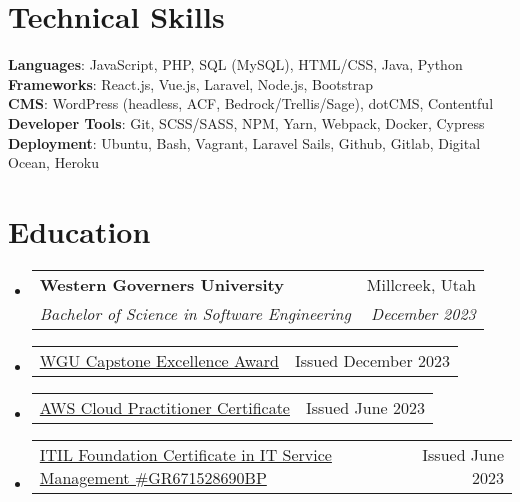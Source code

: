 \documentclass[letterpaper,11pt]{article}
\makeatletter
\newcommand{\resumeSubheading}[4]{
  \vspace{-2pt}\item
    \begin{tabular*}{0.97\textwidth}[t]{l@{\extracolsep{\fill}}r}
      \textbf{#1} & #2 \\
      \textit{\small#3} & \textit{\small #4} \\
    \end{tabular*}\vspace{-7pt}
}
\newcommand{\resumeSubheadingCondensed}[2]{
  \item
    {\small \begin{tabular*}{0.97\textwidth}[t]{l@{\extracolsep{\fill}}r}
      #1 & #2 \\
    \end{tabular*}}\vspace{-7pt}
}
\newcommand{\resumeSubHeadingListStart}{\begin{itemize}[leftmargin=0.15in, label={}]}
\newcommand{\resumeSubHeadingListEnd}{\end{itemize}}
\makeatother
\begin{document}
\section{Technical Skills}
 \begin{itemize}[leftmargin=0.15in, label={}]
    \small{\item{
     \textbf{Languages}{: JavaScript, PHP, SQL (MySQL), HTML/CSS, Java, Python} \\
     \textbf{Frameworks}{: React.js, Vue.js, Laravel, Node.js, Bootstrap} \\
     \textbf{CMS}{: WordPress (headless, ACF, Bedrock/Trellis/Sage), dotCMS, Contentful} \\
     \textbf{Developer Tools}{: Git, SCSS/SASS, NPM, Yarn, Webpack, Docker, Cypress} \\
     \textbf{Deployment}{: Ubuntu, Bash, Vagrant, Laravel Sails, Github, Gitlab, Digital Ocean, Heroku } \\
    }}
 \end{itemize}

\section{Education}
\resumeSubHeadingListStart
  \resumeSubheading
    {Western Governers University}{Millcreek, Utah}
    {Bachelor of Science in  Software Engineering}{December 2023}\vspace{5pt}
  \resumeSubheadingCondensed
    {\href{https://api.badgr.io/public/assertions/vaoUfjA0RT6cZ6-0HZxO3w}{\textcolor{primary}{WGU Capstone Excellence Award}}}{Issued December 2023}
  \resumeSubheadingCondensed
    {\href{https://www.credly.com/badges/a5febee5-016a-4ce3-a014-b824422519a3/public_url}{\textcolor{primary}{AWS Cloud Practitioner Certificate}}}{Issued June 2023}
  \resumeSubheadingCondensed
    {\href{https://www.peoplecert.org/for-corporations/certificate-verification-service}{\textcolor{primary}{ITIL Foundation Certificate in IT Service Management \#GR671528690BP}}}{Issued June 2023}
    
\resumeSubHeadingListEnd

\end{document}
